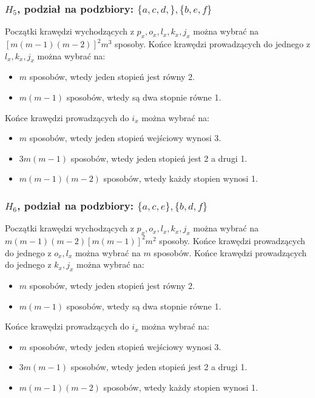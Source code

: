 \documentclass{article}
\begin{document}
\subsubsection{$H_5$, podział na podzbiory: $\{ a,c,d, \}, \{ b,e,f \}$}
Początki krawędzi wychodzących z $p_x,o_x,l_x,k_x,j_x$ można wybrać na $[m(m-1)(m-2)]^2m^3$ sposoby. Końce krawędzi prowadzących do jednego z $l_x,k_x,j_x$ można wybrać na:
\begin{itemize}
  \item $m$ sposobów, wtedy jeden stopień jest równy 2.
  \item $m(m-1)$ sposobów, wtedy są dwa stopnie równe 1.
\end{itemize}
Końce krawędzi prowadzących do $i_x$ można wybrać na:
\begin{itemize}
  \item $m$ sposobów, wtedy jeden stopień wejściowy wynosi 3.
  \item $3m(m-1)$ sposobów, wtedy jeden stopień jest 2 a drugi 1.
  \item $m(m-1)(m-2)$ sposobów, wtedy każdy stopien wynosi 1.
\end{itemize}

\subsubsection{$H_6$, podział na podzbiory: $\{ a,c,e \}, \{ b,d,f \}$}
Początki krawędzi wychodzących z $p_x, o_x, l_x, k_x, j_x$ można wybrać na $m(m-1)(m-2)[m(m-1)]^2m^2$ sposoby. Końce krawędzi prowadzących do jednego z $o_x, l_x$ można wybrać na $m$ sposobów. Końce krawędzi prowadzących do jednego z $k_x,j_x$ można wybrać na:
\begin{itemize}
  \item $m$ sposobów, wtedy jeden stopień jest równy 2.
  \item $m(m-1)$ sposobów, wtedy są dwa stopnie równe 1.
\end{itemize}
Końce krawędzi prowadzących do $i_x$ można wybrać na:
\begin{itemize}
  \item $m$ sposobów, wtedy jeden stopień wejściowy wynosi 3.
  \item $3m(m-1)$ sposobów, wtedy jeden stopień jest 2 a drugi 1.
  \item $m(m-1)(m-2)$ sposobów, wtedy każdy stopien wynosi 1.
\end{itemize}
\end{document}
